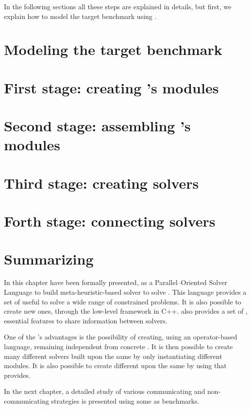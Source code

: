 In the following sections all these steps are explained in details, but first, we explain how to model the target benchmark using \posl.

\section{Modeling the target benchmark}\label{sec:model}


\section{First stage: creating \posl's modules}\label{sec:1ststage}


\section{Second stage: assembling \posl's modules}\label{sec:2ndstage}


\section{Third stage: creating \posl{} solvers}\label{sec:3rdstage}


\section{Forth stage: connecting solvers}\label{sec:4thstage}


\section{Summarizing}\label{sec:posl_zum} \vspace{-10pt}

In this chapter \posl{} have been formally presented, as a Parallel--Oriented Solver Language to build meta-heuristic-based solver to solve \CSPs{}. This language provides a set of \oms{} useful to solve a wide range of constrained problems. It is also possible to create new ones, through the low-level framework in C++. \posl{} also provides a set of \opchs{}, essential features to share information between solvers.

One of the \posl's advantages is the possibility of creating, using an operator-based language, \ass{} remaining independent from concrete \bothmodules{}. It is then possible to create many different solvers built upon the same \as{} by only instantiating different modules. It is also possible to create different \comstrs{} upon the same \soset{} by using \commopers{} that \posl{} provides.

In the next chapter, a detailed study of various communicating and non-communicating strategies is presented using some \CSPs{} as benchmarks. %